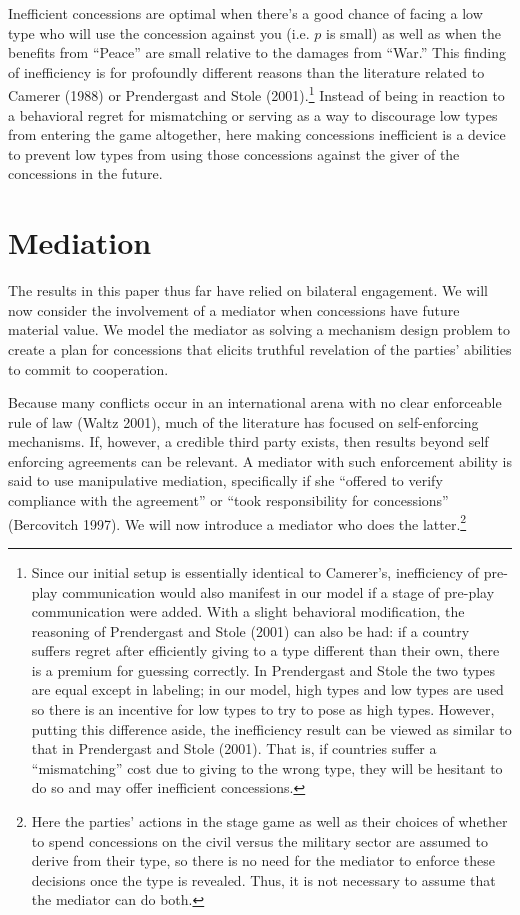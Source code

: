 \documentclass[12pt, letterpaper]{article}
\begin{document}
Inefficient concessions are optimal when there's a good chance of facing a low type who will use the concession against you (i.e. $p$ is small) as well as when the benefits from ``Peace'' are small relative to the damages from ``War.'' This finding of inefficiency is for profoundly different reasons than the literature related to Camerer (1988) or Prendergast and Stole (2001).\footnote{Since our initial setup is essentially identical to Camerer's, inefficiency of  pre-play communication would also manifest in our model if a stage of pre-play communication were added. With a slight behavioral modification, the reasoning of Prendergast and Stole (2001) can also be had: if a country suffers regret after efficiently giving to a type different than their own, there is a premium for guessing correctly. In Prendergast and Stole the two types are equal except in labeling; in our model, high types and low types are used so there is an incentive for low types to try to pose as high types. However, putting this difference aside, the inefficiency result can be viewed as similar to that in Prendergast and Stole (2001). That is, if countries suffer a ``mismatching'' cost due to giving to the wrong type, they will be hesitant to do so and may offer inefficient concessions.} Instead of being in reaction to a behavioral regret for mismatching or serving as a way to discourage low types from entering the game altogether, here making concessions inefficient is a device to prevent low types from using those concessions against the giver of the concessions in the future.

\section{Mediation}
\label{sec:med}
The results in this paper thus far have relied on bilateral engagement. We will now consider the involvement of a mediator when concessions have future material value. We model the mediator as solving a mechanism design problem to create a plan for concessions that elicits truthful revelation of the parties' abilities to commit to cooperation. 

Because many conflicts occur in an international arena with no clear enforceable rule of law (Waltz 2001), much of the literature has focused on self-enforcing mechanisms. If, however, a credible third party exists, then results beyond self enforcing agreements can be relevant.  A mediator with such enforcement ability is said to use manipulative mediation, specifically if she ``offered to verify compliance with the agreement''  or ``took responsibility for concessions''  (Bercovitch 1997). We will now introduce a mediator who does the latter.\footnote{Here the parties' actions in the stage game as well as their choices of whether to spend concessions on the civil versus the military sector are assumed to derive from their type, so there is no need for the mediator to enforce these decisions once the type is revealed. Thus, it is not necessary to assume that the mediator can do both.} 
\end{document}
